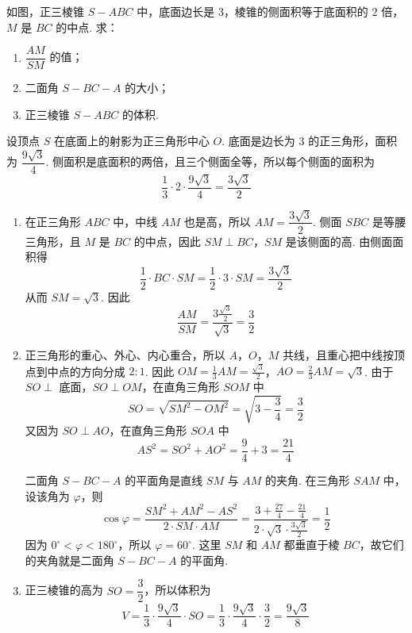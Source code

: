 \begin{problem}
如图，正三棱锥 \(S-ABC\) 中，底面边长是 \(3\)，棱锥的侧面积等于底面积的 \(2\) 倍，\(M\) 是 \(BC\) 的中点. 求：

\begin{enumerate}
\item \(\dfrac{AM}{SM}\) 的值；
\item 二面角 \(S-BC-A\) 的大小；
\item 正三棱锥 \(S-ABC\) 的体积.
\end{enumerate}

\end{problem}

\begin{solution}
设顶点 \(S\) 在底面上的射影为正三角形中心 \(O\). 底面是边长为 \(3\) 的正三角形，面积为 \(\dfrac{9\sqrt3}{4}\). 侧面积是底面积的两倍，且三个侧面全等，所以每个侧面的面积为
\[
\frac13\cdot2\cdot\frac{9\sqrt3}{4}=\frac{3\sqrt3}{2}
\]

\begin{enumerate}
\item 在正三角形 \(ABC\) 中，中线 \(AM\) 也是高，所以 \(AM=\dfrac{3\sqrt3}{2}\). 侧面 \(SBC\) 是等腰三角形，且 \(M\) 是 \(BC\) 的中点，因此 \(SM\perp BC\)，\(SM\) 是该侧面的高. 由侧面面积得
\[
\frac12\cdot BC\cdot SM=\frac12\cdot3\cdot SM=\frac{3\sqrt3}{2}
\]
从而 \(SM=\sqrt3\). 因此
\[
\frac{AM}{SM}=\frac{3\frac{\sqrt3}{2}}{\sqrt3}=\frac32
\]
\item 正三角形的重心、外心、内心重合，所以 \(A\)，\(O\)，\(M\) 共线，且重心把中线按顶点到中点的方向分成 \(2:1\). 因此
\(OM=\frac13AM=\frac{\sqrt3}{2}\)，\(AO=\frac23AM=\sqrt3\).
由于 \(SO\perp\) 底面，\(SO\perp OM\)，在直角三角形 \(SOM\) 中
\[
SO=\sqrt{SM^2-OM^2}=\sqrt{3-\frac34}=\frac32
\]
又因为 \(SO\perp AO\)，在直角三角形 \(SOA\) 中
\[
AS^2=SO^2+AO^2=\frac94+3=\frac{21}{4}
\]

二面角 \(S-BC-A\) 的平面角是直线 \(SM\) 与 \(AM\) 的夹角. 在三角形 \(SAM\) 中，设该角为 \(\varphi\)，则
\[
\cos\varphi=\frac{SM^2+AM^2-AS^2}{2\cdot SM\cdot AM}=\frac{3+\frac{27}{4}-\frac{21}{4}}{2\cdot\sqrt3\cdot\frac{3\sqrt3}{2}}=\frac12
\]
因为 \(0^\circ<\varphi<180^\circ\)，所以 \(\varphi=60^\circ\). 这里 \(SM\) 和 \(AM\) 都垂直于棱 \(BC\)，故它们的夹角就是二面角 \(S-BC-A\) 的平面角.
\item 正三棱锥的高为 \(SO=\dfrac32\)，所以体积为
\[
V=\frac13\cdot\frac{9\sqrt3}{4}\cdot SO=\frac13\cdot\frac{9\sqrt3}{4}\cdot\frac32=\frac{9\sqrt3}{8}
\]
\end{enumerate}
\end{solution}

